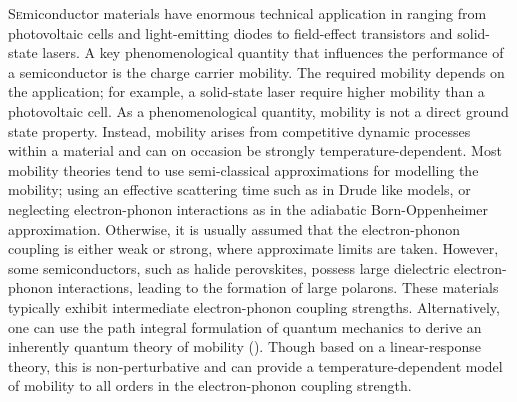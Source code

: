 \lettrine{S}emiconductor materials have enormous technical application in ranging from photovoltaic cells and light-emitting diodes to field-effect transistors and solid-state lasers. A key phenomenological quantity that influences the performance of a semiconductor is the charge carrier mobility. The required mobility depends on the application; for example, a solid-state laser require higher mobility than a photovoltaic cell. As a phenomenological quantity, mobility is not a direct ground state property. Instead, mobility arises from competitive dynamic processes within a material and can on occasion be strongly temperature-dependent. Most mobility theories tend to use semi-classical approximations for modelling the mobility; using an effective scattering time such as in Drude like models, or neglecting electron-phonon interactions as in the adiabatic Born-Oppenheimer approximation. Otherwise, it is usually assumed that the electron-phonon coupling is either weak or strong, where approximate limits are taken. However, some semiconductors, such as halide perovskites, possess large dielectric electron-phonon interactions, leading to the formation of large polarons. These materials typically exhibit intermediate electron-phonon coupling strengths. Alternatively, one can use the path integral formulation of quantum mechanics to derive an inherently quantum theory of mobility (\cite{feynman_slow_1955, feynman_mobility_1962}). Though based on a linear-response theory, this is non-perturbative and can provide a temperature-dependent model of mobility to all orders in the electron-phonon coupling strength.